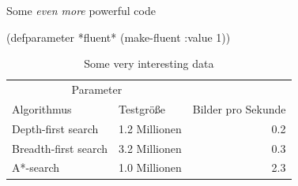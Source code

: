 \documentclass{thesis}
\begin{document}
\begin{listing}
  \caption{Some \emph{even more} powerful code}
  \begin{lispcode}
(defparameter *fluent* (make-fluent :value 1))
  \end{lispcode}
\end{listing}

\blindtext

\begin{table}
  \caption{Some very interesting data}
  \center
  \begin{tabular}{l l r}
  \toprule
  \multicolumn{2}{c}{Parameter}\\
  \cmidrule{1-2}
  Algorithmus & Testgröße & Bilder pro Sekunde\\
  \midrule
  Depth-first search & 1.2 Millionen & 0.2\\
  \addlinespace
  Breadth-first search & 3.2 Millionen & 0.3\\
  \addlinespace
  A*-search & 1.0 Millionen & 2.3\\
  \bottomrule
  \end{tabular}
\end{table}

\Blinddocument
\end{document}
